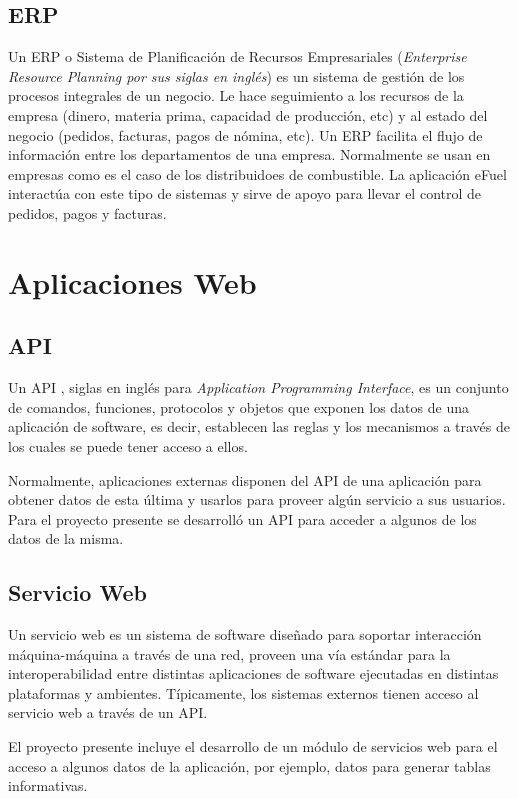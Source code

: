     \subsection{ERP} \label{erp}
    Un ERP \cite{internetEncyclopedia} o Sistema de Planificación de Recursos Empresariales (\emph{Enterprise Resource Planning por sus siglas en inglés}) es un sistema de gestión de los procesos integrales de un negocio. Le hace seguimiento a los recursos de la empresa (dinero, materia prima, capacidad de producción, etc) y al estado del negocio (pedidos, facturas, pagos de nómina, etc). Un ERP facilita el flujo de información entre los departamentos de una empresa. Normalmente se usan en empresas como es el caso de los distribuidoes de combustible. La aplicación eFuel interactúa con este tipo de sistemas y sirve de apoyo para llevar el control de pedidos, pagos y facturas.

\section{Aplicaciones Web}
    \subsection{API}
    Un API \cite{apiChristensson}, siglas en inglés para \textit{Application Programming Interface}, es un conjunto de comandos, funciones, protocolos y objetos que exponen los datos de una aplicación de software, es decir, establecen las reglas y los mecanismos a través de los cuales se puede tener acceso a ellos.

    Normalmente, aplicaciones externas disponen del API de una aplicación para obtener datos de esta última y usarlos para proveer algún servicio a sus usuarios. Para el proyecto presente se desarrolló un API para acceder a algunos de los datos de la misma.

    \subsection{Servicio Web} \label{webService}
    Un servicio web \cite{webServiceW3C} es un sistema de software diseñado para soportar interacción máquina-máquina a través de una red, proveen una vía estándar para la interoperabilidad entre distintas aplicaciones de software ejecutadas en distintas plataformas y ambientes. Típicamente, los sistemas externos tienen acceso al servicio web a través de un API.

    El proyecto presente incluye el desarrollo de un módulo de servicios web para el acceso a algunos datos de la aplicación, por ejemplo, datos para generar tablas informativas.

